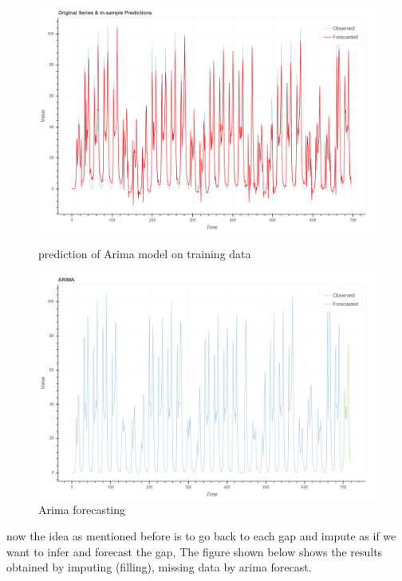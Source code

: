 \begin{figure}[H]
\centering
\begin{minipage}{.46\linewidth}
    \includegraphics[width=.9\textwidth]{img/arima_training.png}    
    \caption{prediction of Arima model on training data}
    \label{fig:trainig_arima}
\end{minipage}
\hfill
\begin{minipage}{.49\linewidth}
    \includegraphics[width=.9\textwidth]{img/arima_forcasting.png} 
    \caption{Arima forecasting}
    \label{fig:forcasting}
\end{minipage}
\end{figure}

now the idea as mentioned before is to go back to each gap and impute as if we want to infer and forecast the gap, The figure shown below shows the results obtained by imputing (filling), missing data by arima forecast.

